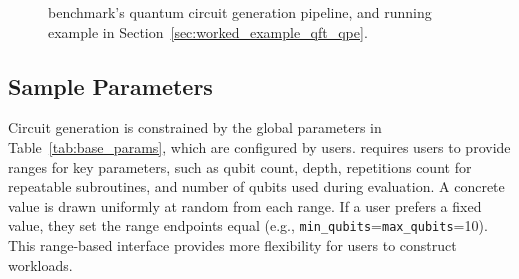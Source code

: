 \begin{figure}[t]
\caption{\sys benchmark's quantum circuit generation pipeline, and  
running example in Section~\ref{sec:worked_example_qft_qpe}.
}
\label{fig:sec41_running_example}
\end{figure}

\subsection{Sample Parameters}

Circuit generation is constrained by the global parameters in
Table~\ref{tab:base_params}, which are configured by users.
\sys requires users to provide ranges for key parameters, such as qubit count,
depth, 
repetitions count for repeatable subroutines, and number of qubits used during evaluation. A concrete value is drawn uniformly at random
from each range. If a user prefers a fixed value, they set the range endpoints equal
(e.g., \texttt{min\_qubits}=\texttt{max\_qubits}=10). This range-based interface provides more flexibility for users to construct workloads. 

